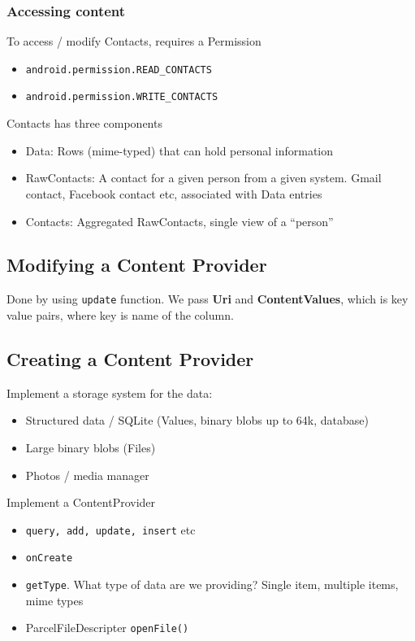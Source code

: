 \documentclass{article}
\begin{document}
\subsubsection{Accessing content}

\begin{flushleft}
To access / modify Contacts, requires a Permission
\begin{itemize}
  \item \verb|android.permission.READ_CONTACTS| 
  \item \verb|android.permission.WRITE_CONTACTS|
\end{itemize}
Contacts has three components
\begin{itemize}
  \item Data: Rows (mime-typed) that can hold personal information
  \item RawContacts: A contact for a given person from a given system. Gmail contact, Facebook contact etc, associated with Data entries
  \item Contacts: Aggregated RawContacts, single view of a “person”
\end{itemize}
\end{flushleft}

\subsection{Modifying a Content Provider}

\begin{flushleft}
Done by using \texttt{update} function. We pass \textbf{Uri} and \textbf{ContentValues}, which is key value pairs, where key is name of the column.
\end{flushleft}

\subsection{Creating a Content Provider}

\begin{flushleft}
Implement a storage system for the data:
\begin{itemize}
  \item Structured data / SQLite (Values, binary blobs up to 64k, database)
  \item Large binary blobs (Files)
  \item Photos / media manager
\end{itemize}
Implement a ContentProvider
\begin{itemize}
  \item \texttt{query, add, update, insert} etc 
  \item \texttt{onCreate }
  \item \texttt{getType}. What type of data are we providing? Single item, multiple items, mime types 
  \item ParcelFileDescripter \texttt{openFile()}
\end{itemize}
\end{flushleft}
\end{document}
